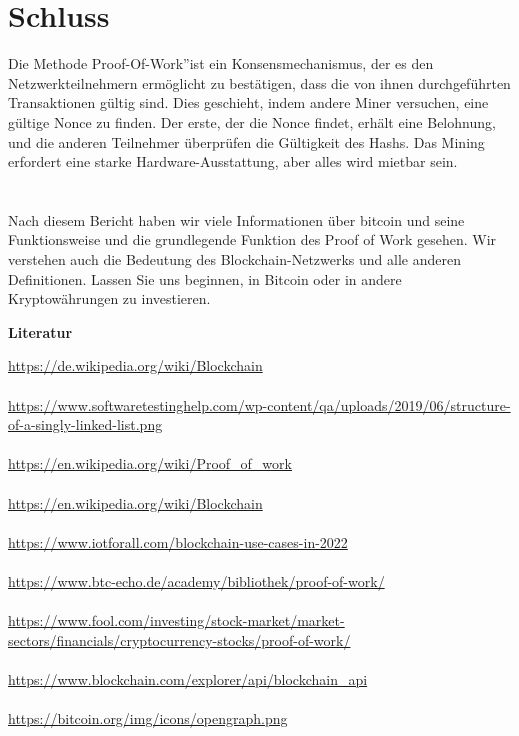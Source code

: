 \documentclass[ngerman]{scrreprt}
\begin{document}
\chapter{Schluss}
Die Methode \textquestiondown Proof-Of-Work\textquotedblright ist ein Konsensmechanismus, der es den Netzwerkteilnehmern ermöglicht zu bestätigen, dass die von ihnen durchgeführten Transaktionen gültig sind. Dies geschieht, indem andere Miner versuchen, eine gültige Nonce zu finden. Der erste, der die Nonce findet, erhält eine Belohnung, und die anderen Teilnehmer überprüfen die Gültigkeit des Hashs. Das Mining erfordert eine starke Hardware-Ausstattung, aber alles wird mietbar sein.\\ \\ \\

Nach diesem Bericht haben wir viele Informationen über bitcoin und seine Funktionsweise und die grundlegende Funktion des Proof of Work gesehen. Wir verstehen auch die Bedeutung des Blockchain-Netzwerks und alle anderen Definitionen. Lassen Sie uns beginnen, in Bitcoin oder in andere Kryptowährungen zu investieren.\\

\newpage
\begin{center}
	\begin{LARGE}
		\textbf{Literatur}
	\end{LARGE}
\end{center}

\url{https://de.wikipedia.org/wiki/Blockchain} \\ \\
\url{https://www.softwaretestinghelp.com/wp-content/qa/uploads/2019/06/structure-of-a-singly-linked-list.png} \\ \\
\url{https://en.wikipedia.org/wiki/Proof\_of\_work} \\ \\
\url{https://en.wikipedia.org/wiki/Blockchain} \\ \\
\url{https://www.iotforall.com/blockchain-use-cases-in-2022} \\ \\

\url{https://www.btc-echo.de/academy/bibliothek/proof-of-work/} \\ \\
\url{https://www.fool.com/investing/stock-market/market-sectors/financials/cryptocurrency-stocks/proof-of-work/} \\ \\
\url{https://www.blockchain.com/explorer/api/blockchain\_api}\\ \\
\url{https://bitcoin.org/img/icons/opengraph.png}\\ \\
\end{document}
